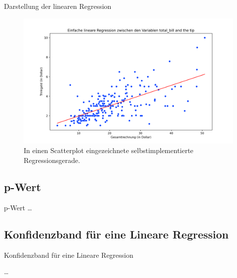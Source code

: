 \begin{frame}{Darstellung der linearen Regression}
\begin{figure}
    \centering
    \includegraphics[scale=0.13]{../../paper/figures/simple_reg.png}
    \caption{In einen Scatterplot eingezeichnete selbstimplementierte Regressionsgerade.}
    \label{fig:regression}
\end{figure}
\end{frame}

\subsection{p-Wert}
\begin{frame}{p-Wert}
    \dots
\end{frame}

\subsection{Konfidenzband für eine Lineare Regression}
\begin{frame}{Konfidenzband für eine Lineare Regression}
    
    \dots
\end{frame}
